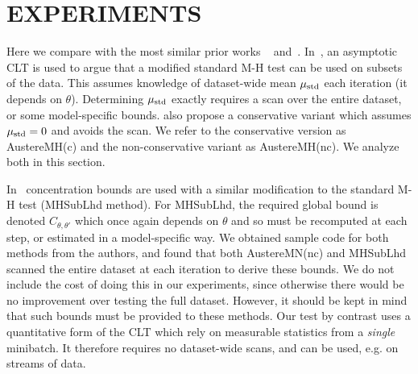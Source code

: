 \documentclass[letterpaper]{article}
\begin{document}
\section{EXPERIMENTS}\label{sec:experiments}
Here we compare with the most similar prior works
~\citep{cutting_mh_2014} and~\cite{icml2014c1_bardenet14}.
In~\citep{cutting_mh_2014}, an asymptotic CLT is used to argue that a
modified standard M-H test can be used on subsets of the data. This
assumes knowledge of dataset-wide mean $\mu_{\rm std}$ each iteration
(it depends on $\theta$). Determining $\mu_{\rm std}$ exactly requires
a scan over the entire dataset, or some model-specific bounds.
\citep{cutting_mh_2014} also propose a conservative variant which
assumes $\mu_{\rm std}=0$ and avoids the scan.  We refer to the
conservative version as {\sc AustereMH(c)} and the non-conservative
variant as {\sc AustereMH(nc)}. We analyze both in this section.

In~\citep{icml2014c1_bardenet14}
concentration bounds are used with a similar modification to the standard M-H
test ({\sc MHSubLhd} method).  For {\sc MHSubLhd}, the required global
bound is denoted $C_{\theta, \theta'}$ which once again depends on
$\theta$ and so must be recomputed at each step, or estimated in a
model-specific way.   We obtained
sample code for both methods from the authors, and found that both
{\sc AustereMN(nc)} and {\sc MHSubLhd} scanned the entire dataset at
each iteration to derive these bounds. We do not include the cost of
doing this in our experiments, since otherwise there would be no
improvement over testing the full dataset. However, it should be kept
in mind that such bounds must be provided to these methods.
Our test by contrast uses a quantitative form of the CLT
which rely on measurable statistics from a \emph{single} minibatch.
It therefore requires no dataset-wide scans, and can be used, e.g. on
streams of data. 
\end{document}
